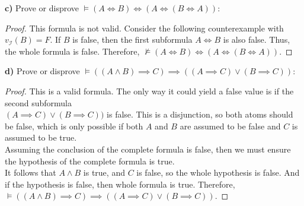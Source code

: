 \documentclass[titlepage, letterpaper, fleqn]{article}
\newcommand{\spacepls}{\vspace{5mm}}
\begin{document}
\spacepls

{\large \textbf{c)} Prove or disprove \(\models (A \iff B) \iff (A \iff (B \iff A))\):}

\begin{proof}
This formula is not valid. Consider  the following counterexample with \(v_{\mathscr{I}}(B) = F\). If \(B\) is false, then the first subformula \(A \iff B\) is also false. Thus, the whole formula is false.
Therefore, \(\not \models (A \iff B) \iff (A \iff (B \iff A))\).
\end{proof}

\spacepls

{\large \textbf{d)} Prove or disprove \(\models ((A \wedge B) \implies C) \implies ((A \implies C) \vee (B \implies C))\):}

\begin{proof}
This is a valid formula.
The only way it could yield a false value is if the second subformula\\
\((A \implies C) \vee (B \implies C))\) is false.
This is a disjunction, so both atoms should be false, which is only possible if both \(A\) and \(B\) are assumed to be false and \(C\) is assumed to be true.\\
Assuming the conclusion of the complete formula is false, then we must ensure the hypothesis of the complete formula is true.\\
It follows that \(A \wedge B\) is true, and \(C\) is false, so the whole hypothesis is false. And if the hypothesis is false, then whole formula is true.
Therefore, \(\models ((A \wedge B) \implies C) \implies ((A \implies C) \vee (B \implies C))\).
\end{proof}
\end{document}
